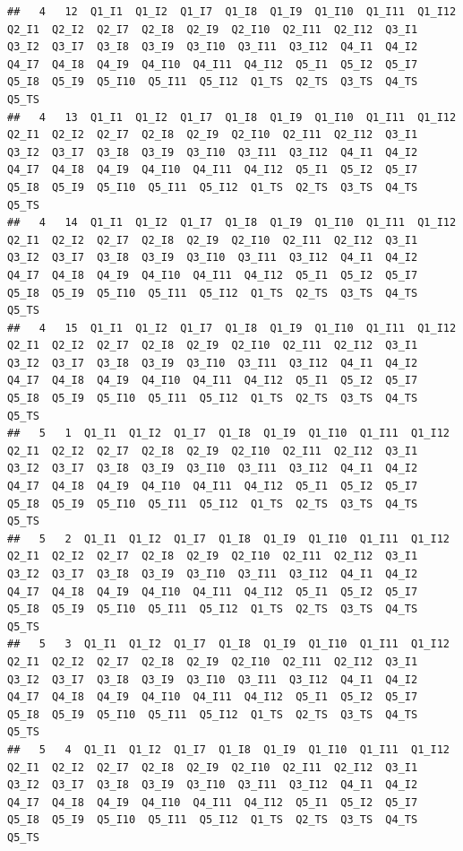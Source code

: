\documentclass[
]{book}
\begin{document}
\begin{verbatim}
##   4   12  Q1_I1  Q1_I2  Q1_I7  Q1_I8  Q1_I9  Q1_I10  Q1_I11  Q1_I12  Q2_I1  Q2_I2  Q2_I7  Q2_I8  Q2_I9  Q2_I10  Q2_I11  Q2_I12  Q3_I1  Q3_I2  Q3_I7  Q3_I8  Q3_I9  Q3_I10  Q3_I11  Q3_I12  Q4_I1  Q4_I2  Q4_I7  Q4_I8  Q4_I9  Q4_I10  Q4_I11  Q4_I12  Q5_I1  Q5_I2  Q5_I7  Q5_I8  Q5_I9  Q5_I10  Q5_I11  Q5_I12  Q1_TS  Q2_TS  Q3_TS  Q4_TS  Q5_TS
##   4   13  Q1_I1  Q1_I2  Q1_I7  Q1_I8  Q1_I9  Q1_I10  Q1_I11  Q1_I12  Q2_I1  Q2_I2  Q2_I7  Q2_I8  Q2_I9  Q2_I10  Q2_I11  Q2_I12  Q3_I1  Q3_I2  Q3_I7  Q3_I8  Q3_I9  Q3_I10  Q3_I11  Q3_I12  Q4_I1  Q4_I2  Q4_I7  Q4_I8  Q4_I9  Q4_I10  Q4_I11  Q4_I12  Q5_I1  Q5_I2  Q5_I7  Q5_I8  Q5_I9  Q5_I10  Q5_I11  Q5_I12  Q1_TS  Q2_TS  Q3_TS  Q4_TS  Q5_TS
##   4   14  Q1_I1  Q1_I2  Q1_I7  Q1_I8  Q1_I9  Q1_I10  Q1_I11  Q1_I12  Q2_I1  Q2_I2  Q2_I7  Q2_I8  Q2_I9  Q2_I10  Q2_I11  Q2_I12  Q3_I1  Q3_I2  Q3_I7  Q3_I8  Q3_I9  Q3_I10  Q3_I11  Q3_I12  Q4_I1  Q4_I2  Q4_I7  Q4_I8  Q4_I9  Q4_I10  Q4_I11  Q4_I12  Q5_I1  Q5_I2  Q5_I7  Q5_I8  Q5_I9  Q5_I10  Q5_I11  Q5_I12  Q1_TS  Q2_TS  Q3_TS  Q4_TS  Q5_TS
##   4   15  Q1_I1  Q1_I2  Q1_I7  Q1_I8  Q1_I9  Q1_I10  Q1_I11  Q1_I12  Q2_I1  Q2_I2  Q2_I7  Q2_I8  Q2_I9  Q2_I10  Q2_I11  Q2_I12  Q3_I1  Q3_I2  Q3_I7  Q3_I8  Q3_I9  Q3_I10  Q3_I11  Q3_I12  Q4_I1  Q4_I2  Q4_I7  Q4_I8  Q4_I9  Q4_I10  Q4_I11  Q4_I12  Q5_I1  Q5_I2  Q5_I7  Q5_I8  Q5_I9  Q5_I10  Q5_I11  Q5_I12  Q1_TS  Q2_TS  Q3_TS  Q4_TS  Q5_TS
##   5   1  Q1_I1  Q1_I2  Q1_I7  Q1_I8  Q1_I9  Q1_I10  Q1_I11  Q1_I12  Q2_I1  Q2_I2  Q2_I7  Q2_I8  Q2_I9  Q2_I10  Q2_I11  Q2_I12  Q3_I1  Q3_I2  Q3_I7  Q3_I8  Q3_I9  Q3_I10  Q3_I11  Q3_I12  Q4_I1  Q4_I2  Q4_I7  Q4_I8  Q4_I9  Q4_I10  Q4_I11  Q4_I12  Q5_I1  Q5_I2  Q5_I7  Q5_I8  Q5_I9  Q5_I10  Q5_I11  Q5_I12  Q1_TS  Q2_TS  Q3_TS  Q4_TS  Q5_TS
##   5   2  Q1_I1  Q1_I2  Q1_I7  Q1_I8  Q1_I9  Q1_I10  Q1_I11  Q1_I12  Q2_I1  Q2_I2  Q2_I7  Q2_I8  Q2_I9  Q2_I10  Q2_I11  Q2_I12  Q3_I1  Q3_I2  Q3_I7  Q3_I8  Q3_I9  Q3_I10  Q3_I11  Q3_I12  Q4_I1  Q4_I2  Q4_I7  Q4_I8  Q4_I9  Q4_I10  Q4_I11  Q4_I12  Q5_I1  Q5_I2  Q5_I7  Q5_I8  Q5_I9  Q5_I10  Q5_I11  Q5_I12  Q1_TS  Q2_TS  Q3_TS  Q4_TS  Q5_TS
##   5   3  Q1_I1  Q1_I2  Q1_I7  Q1_I8  Q1_I9  Q1_I10  Q1_I11  Q1_I12  Q2_I1  Q2_I2  Q2_I7  Q2_I8  Q2_I9  Q2_I10  Q2_I11  Q2_I12  Q3_I1  Q3_I2  Q3_I7  Q3_I8  Q3_I9  Q3_I10  Q3_I11  Q3_I12  Q4_I1  Q4_I2  Q4_I7  Q4_I8  Q4_I9  Q4_I10  Q4_I11  Q4_I12  Q5_I1  Q5_I2  Q5_I7  Q5_I8  Q5_I9  Q5_I10  Q5_I11  Q5_I12  Q1_TS  Q2_TS  Q3_TS  Q4_TS  Q5_TS
##   5   4  Q1_I1  Q1_I2  Q1_I7  Q1_I8  Q1_I9  Q1_I10  Q1_I11  Q1_I12  Q2_I1  Q2_I2  Q2_I7  Q2_I8  Q2_I9  Q2_I10  Q2_I11  Q2_I12  Q3_I1  Q3_I2  Q3_I7  Q3_I8  Q3_I9  Q3_I10  Q3_I11  Q3_I12  Q4_I1  Q4_I2  Q4_I7  Q4_I8  Q4_I9  Q4_I10  Q4_I11  Q4_I12  Q5_I1  Q5_I2  Q5_I7  Q5_I8  Q5_I9  Q5_I10  Q5_I11  Q5_I12  Q1_TS  Q2_TS  Q3_TS  Q4_TS  Q5_TS

\end{verbatim}
\end{document}

